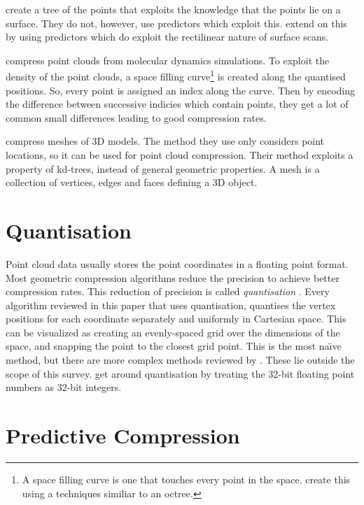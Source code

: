 \documentclass{report}
\begin{document}
\citet{gumholdcomp} create a tree of the points that exploits the knowledge
that the points lie on a surface. They do not, however, use predictors which
exploit this. \citet{merrycomp} extend on this by using predictors which do
exploit the rectilinear nature of surface scans.

\citet{omeltchenko2000sls} compress point clouds from molecular dynamics
simulations. To exploit the density of the point clouds, a space filling
curve\footnote{A space filling curve is one that touches every point in the
  space. \citet{omeltchenko2000sls} create this using a techniques similiar to
  an octree.} is created along the quantised positions. So, every point is
assigned an index along the curve. Then by encoding the difference between
successive indicies which contain points, they get a lot of common small
differences leading to good compression rates.

\citet{devillers2000gci} compress meshes of 3D models. The method they use
only considers point locations, so it can be used for point cloud
compression. Their method exploits a property of kd-trees, instead of general
geometric properties. A mesh is a collection of vertices, edges and faces
defining a 3D object.


\section{Quantisation}

Point cloud data usually stores the point coordinates in a floating point
format. Most geometric compression algorithms reduce the precision to achieve
better compression rates. This reduction of precision is called
\emph{quantisation} \citep{ag-racm-03}. Every algorithm reviewed in this paper
that uses quantisation, quantises the vertex positions for each coordinate
separately and uniformly in Cartesian space. This can be visualized as
creating an evenly-spaced grid over the dimensions of the space, and snapping
the point to the closest grid point. This is the most na\"{\i}ve method, but
there are more complex methods reviewed by \citet{ag-racm-03}. These lie
outside the scope of this survey. \citet{chen2005lcp} get around quantisation
by treating the 32-bit floating point numbers as 32-bit integers.


\section{Predictive Compression}
\end{document}

